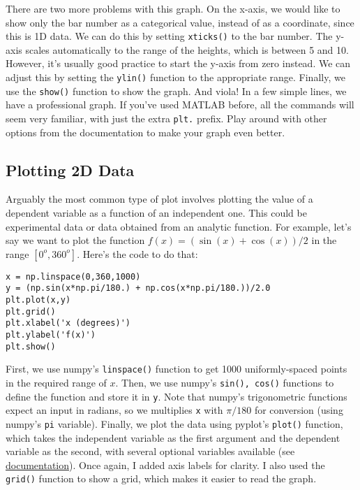 \documentclass[12pt]{article}
\newcommand{\code}{\texttt}
\begin{document}
There are two more problems with this graph. On the x-axis, we would like to show only the bar number as a categorical value, instead of as a coordinate, since this is 1D data. We can do this by setting \code{xticks()} to the bar number. The y-axis scales automatically to the range of the heights, which is between 5 and 10. However, it's usually good practice to start the y-axis from zero instead. We can adjust this by setting the \code{ylin()} function to the appropriate range. Finally, we use the \code{show()} function to show the graph. And viola! In a few simple lines, we have a professional graph. If you've used MATLAB before, all the commands will seem very familiar, with just the extra \code{plt.} prefix. Play around with other options from the documentation to make your graph even better. 

\subsection{Plotting 2D Data}
Arguably the most common type of plot involves plotting the value of a dependent variable as a function of an independent one. This could be experimental data or data obtained from an analytic function. For example, let's say we want to plot the function $f(x) = (\sin(x)+\cos(x))/2$ in the range $[0^o,360^o]$. Here's the code to do that:

\begin{lstlisting}[frame=single] 
x = np.linspace(0,360,1000)
y = (np.sin(x*np.pi/180.) + np.cos(x*np.pi/180.))/2.0
plt.plot(x,y)
plt.grid()
plt.xlabel('x (degrees)')
plt.ylabel('f(x)')
plt.show()
\end{lstlisting}

First, we use numpy's \code{linspace()} function to get 1000 uniformly-spaced points in the required range of $x$. Then, we use numpy's \code{sin(), cos()} functions to define the function and store it in \code{y}. Note that numpy's trigonometric functions expect an input in radians, so we multiplies \code{x} with $\pi/180$ for conversion (using numpy's \code{pi} variable). Finally, we plot the data using pyplot's \code{plot()} function, which takes the independent variable as the first argument and the dependent variable as the second, with several optional variables available (see \href{https://matplotlib.org/api/_as_gen/matplotlib.pyplot.plot.html}{documentation}). Once again, I added axis labels for clarity. I also used the \code{grid()} function to show a grid, which makes it easier to read the graph. 
\end{document}
